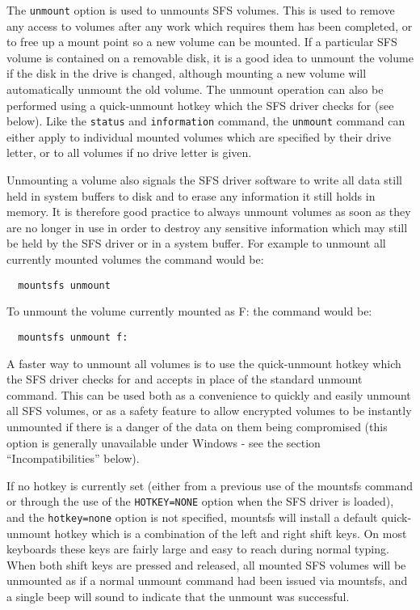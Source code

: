The {\tt unmount} option is used to unmounts SFS volumes.  This is used to remove
any access to volumes after any work which requires them has been completed, or
to free up a mount point so a new volume can be mounted.  If a particular SFS
volume is contained on a removable disk, it is a good idea to unmount the
volume if the disk in the drive is changed, although mounting a new volume will
automatically unmount the old volume.  The unmount operation can also be
performed using a quick-unmount hotkey which the SFS driver checks for (see
below).  Like the {\tt status} and {\tt information} command, the {\tt unmount} command can
either apply to individual mounted volumes which are specified by their drive
letter, or to all volumes if no drive letter is given.

Unmounting a volume also signals the SFS driver software to write all data
still held in system buffers to disk and to erase any information it still
holds in memory.  It is therefore good practice to always unmount volumes as
soon as they are no longer in use in order to destroy any sensitive information
which may still be held by the SFS driver or in a system buffer.  For example
to unmount all currently mounted volumes the command would be:

{\tt \verb|  |mountsfs unmount}

To unmount the volume currently mounted as F: the command would be:

{\tt \verb|  |mountsfs unmount f:}

A faster way to unmount all volumes is to use the quick-unmount hotkey which
the SFS driver checks for and accepts in place of the standard unmount command.
This can be used both as a convenience to quickly and easily unmount all SFS
volumes, or as a safety feature to allow encrypted volumes to be instantly
unmounted if there is a danger of the data on them being compromised (this
option is generally unavailable under Windows - see the section
``Incompatibilities'' below).

If no hotkey is currently set (either from a previous use of the mountsfs
command or through the use of the {\tt HOTKEY=NONE} option when the SFS driver is
loaded), and the {\tt hotkey=none} option is not specified, mountsfs will install a 
default quick-unmount hotkey which is a combination of the left and right shift 
keys.  On most keyboards these keys are fairly large and easy to reach during 
normal typing.  When both shift keys are pressed and released, all mounted SFS 
volumes will be unmounted as if a normal unmount command had been issued via 
mountsfs, and a single beep will sound to indicate that the unmount was 
successful.

